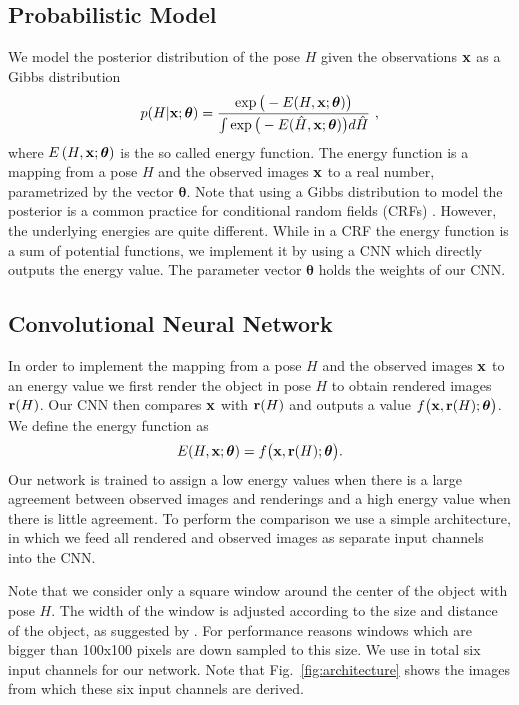 \documentclass[10pt,letterpaper]{article}
\newcommand{\btheta}{\boldsymbol\theta}
\newcommand{\bx}{{\bf x}}
\begin{document}
\subsection{Probabilistic Model}
We model the posterior distribution of the pose $H$ given the observations $\bx$ as a Gibbs distribution
\begin{equation} \label{eq:Gibbs}
	p(H| \bx ;\btheta)=\frac{\exp \big( -E(H,\bx;\btheta) \big)} 
	{\int \exp \big(-E (\hat{H},\bx;\btheta )  \big) d \hat{H}} \ ,
\end{equation}
where $ E\left(H,\bx;\btheta \right)$ is the so called energy function.  The energy function is a mapping from a pose $H$ and the observed images $\bx$ to a real number, parametrized by the vector $\btheta$. Note that using a Gibbs distribution to model the posterior is a common practice for conditional random fields (CRFs) \cite{Lafferty01}. However, the underlying energies are quite different. While in a CRF the energy function is a sum of potential functions, we implement it by using a CNN which directly outputs the energy value. The parameter vector $\btheta$ holds the weights of our CNN.

\subsection{Convolutional Neural Network \label{sec:convnet}}
In order to implement the mapping from a pose $H$ and the observed images $\bf x$ to an energy value we first render the object in pose $H$ to obtain rendered images ${\bf r}(H)$. Our CNN then compares $\bf x$ with ${\bf r}(H)$ and outputs a value $f\big( \bx, {\bf r}(H) ; \btheta \big)$. We define the energy function as
\begin{equation} \label{eq:ourEnergy}
E(H,\bx;\btheta)=f\big( \bx, {\bf r}(H) ; \btheta \big).
\end{equation}
Our network is trained to assign a low energy values when there is a large agreement between observed images and renderings and a high energy value when there is little agreement.
To perform the comparison we use a simple architecture, in which we feed all rendered and observed images as separate input channels into the CNN. 

Note that we consider only a square window around the center of the object with pose $H$. The width of the window is adjusted according to the size and distance of the object, as suggested by \cite{brachmann2014}. For performance reasons windows which are bigger than 100x100 pixels are down sampled to this size. We use in total six input channels for our network. Note that Fig.~\ref{fig:architecture} shows the images from which these six input channels are derived. 
\end{document}
